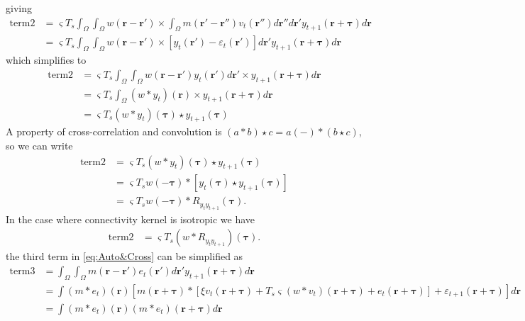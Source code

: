 \documentclass[]{article}
\begin{document}
giving
\begin{align}
	\text{term2} &=  \varsigma T_s \int_{\Omega}\int_{\Omega} w(\mathbf{r}-\mathbf{r}') 
	\times \int_{\Omega} m(\mathbf{r}'-\mathbf{r}'')  v_t(\mathbf{r}'') d\mathbf{r}'' d\mathbf{r}' y_{t+1}(\mathbf{r}+\boldsymbol{\tau}) d\mathbf{r} \nonumber \\
&=\varsigma T_s \int_{\Omega}\int_{\Omega} w(\mathbf{r}-\mathbf{r}') 
	\times \left[y_t(\mathbf r')- \varepsilon_t(\mathbf r')\right]  d\mathbf{r}' y_{t+1}(\mathbf{r}+\boldsymbol{\tau}) d\mathbf{r}
\end{align}
which simplifies to
\begin{align}
	\text{term2}&=  \varsigma T_s \int_{\Omega}\int_{\Omega} w(\mathbf{r}-\mathbf{r}')y_t(\mathbf{r}') d\mathbf{r}' 
	\times y_{t+1}(\mathbf{r}+\boldsymbol{\tau}) d\mathbf{r} \nonumber \\
&=\varsigma T_s \int_{\Omega} (w\ast y_t)(\mathbf{r})\times y_{t+1}(\mathbf{r}+\boldsymbol{\tau}) d\mathbf{r} \nonumber \\
&=\varsigma T_s(w\ast y_t)(\boldsymbol{\tau}) \star  y_{t+1}(\boldsymbol{\tau})
\end{align}
A property of cross-correlation and convolution is $(a \ast b) \star c = a(-)\ast(b \star c)$, so we can write
\begin{align}
	\text{term2}&= \varsigma T_s(w\ast y_t)(\boldsymbol{\tau}) \star  y_{t+1}(\boldsymbol{\tau}) \nonumber \\
	&= \varsigma T_s w(-\boldsymbol\tau)\ast \left[  y_t(\boldsymbol{\tau}) \star  y_{t+1}(\boldsymbol{\tau})\right] \nonumber \\
	&=\varsigma T_s w(-\boldsymbol\tau)\ast R_{y_ty_{t+1}} (\boldsymbol{\tau}).
\end{align}
In the case where connectivity kernel is isotropic we have
\begin{align}
	\text{term2}&= \varsigma T_s (w \ast R_{y_ty_{t+1}}) (\boldsymbol{\tau}).
\end{align}
the third term in \eqref{eq:Auto&Cross} can be simplified as
\begin{align}\label{eq:term3Noisy}
\text{term3}&=\int_{\Omega}\int_{\Omega} m(\mathbf{r}-\mathbf{r}')e_t(\mathbf{r}')d\mathbf{r}'y_{t+1}(\mathbf{r}+\boldsymbol{\tau})  d\mathbf{r} \nonumber \\
&=\int \left(m \ast e_t\right)(\mathbf r)\left[m\left(\mathbf{r}+\boldsymbol\tau\right) \ast \left[\xi v_t\left(\mathbf{r}+\boldsymbol\tau\right) + 
	T_s \varsigma \left(w \ast v_t\right)(\mathbf r + \boldsymbol \tau)
	+ e_t\left(\mathbf{r}+\boldsymbol{\tau}\right) \right]+\varepsilon_{t+1}(\mathbf r+\boldsymbol\tau) \right]d\mathbf r \nonumber \\
	&=\int\left(m \ast e_t\right)(\mathbf r)\left(m \ast e_t\right)(\mathbf r+\boldsymbol\tau)d\mathbf r
\end{align}
\end{document}
